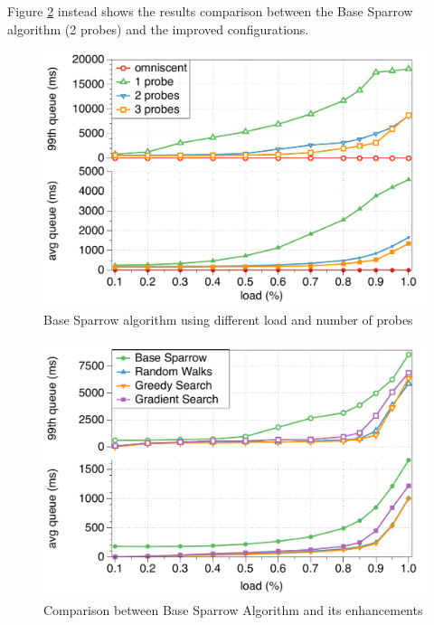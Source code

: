 \documentclass[conference]{IEEEtran}
\begin{document}
Figure \ref{fig:comparison} instead shows the results comparison between the Base Sparrow algorithm (2 probes) and the improved configurations.

\begin{figure}
\begin{center}
\includegraphics[scale=0.5]{figures/probes_new}
\caption{Base Sparrow algorithm using different load and number of probes}
\label{fig:probes}
\end{center}
\end{figure}

\begin{figure}
\begin{center}
\includegraphics[scale=0.5]{figures/comparison_new}
\caption{Comparison between Base Sparrow Algorithm and its enhancements}
\label{fig:comparison}
\end{center}
\end{figure}
\end{document}
